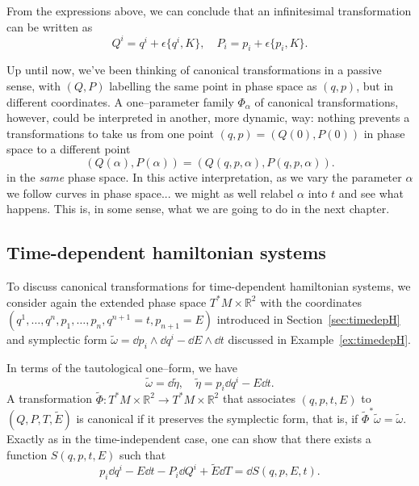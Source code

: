 \documentclass[english,fontsize=11pt,paper=b5]{scrbook}
\theoremstyle{definition}
\begin{document}
    From the expressions above, we can conclude that an infinitesimal transformation can be written as
    \begin{equation}\label{eq:forminfct}
      Q^i = q^i + \epsilon \big\{q^i, K\big\}, \quad
      P_i = p_i + \epsilon \big\{p_i, K\big\}.
    \end{equation}

    Up until now, we've been thinking of canonical transformations in a passive sense, with $(Q,P)$ labelling the same point in phase space as $(q, p)$, but in different coordinates.
    A one--parameter family $\Phi_\alpha$ of canonical transformations, however, could be interpreted in another, more dynamic, way: nothing prevents a transformations to take us from one point $(q,p)=(Q(0), P(0))$ in phase space to a different point
    \begin{equation}
      (Q(\alpha),P(\alpha)) = (Q(q,p,\alpha), P(q,p,\alpha)).
    \end{equation}
    in the \emph{same} phase space.
    In this active interpretation, as we vary the parameter $\alpha$ we follow curves in phase space... we might as well relabel $\alpha$ into $t$ and see what happens.
    This is, in some sense, what we are going to do in the next chapter.

    \subsection{Time-dependent hamiltonian systems}

    To discuss canonical transformations for time-dependent hamiltonian systems, we consider again the extended phase space $T^*M\times \mathbb{R}^2$ with the coordinates $(q^1,\ldots,q^n,p_1,\ldots,p_n, q^{n+1}=t, p_{n+1}=E)$ introduced in Section~\ref{sec:timedepH} and symplectic form  $\widetilde\omega = \dd p_i\wedge \dd q^i - \dd E\wedge \dd t$ discussed in Example~\ref{ex:timedepH}.

    In terms of the tautological one--form, we have
    \begin{equation}
      \widetilde\omega = \dd \widetilde\eta, \quad \widetilde\eta = p_i \dd q^i - E \dd t.
    \end{equation}
    A transformation $\widetilde\Phi : T^*M\times \mathbb{R}^2 \to T^*M\times \mathbb{R}^2$ that associates $(q,p,t,E)$ to $(Q,P,T,\widetilde E)$ is canonical if it preserves the symplectic form, that is, if ${\widetilde\Phi}^* \widetilde \omega = \widetilde \omega$. Exactly as in the time-independent case, one can show that there exists a function $S(q,p,t,E)$ such that
    \begin{equation}\label{eq:timedepgen}
      p_i \dd q^i -E \dd t - P_i \dd Q^i + \widetilde E \dd T = \dd S(q,p,E,t).
    \end{equation}
\end{document}
